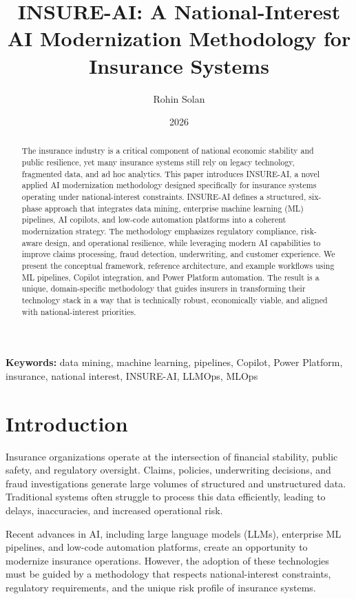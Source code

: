 \documentclass{article}
\title{INSURE-AI: A National-Interest AI Modernization Methodology for Insurance Systems}
\author{Rohin Solan}
\date{2026}
\begin{document}
\maketitle

\begin{abstract}
The insurance industry is a critical component of national economic stability and public resilience, yet many insurance systems still rely on legacy technology, fragmented data, and ad hoc analytics. This paper introduces INSURE-AI, a novel applied AI modernization methodology designed specifically for insurance systems operating under national-interest constraints. INSURE-AI defines a structured, six-phase approach that integrates data mining, enterprise machine learning (ML) pipelines, AI copilots, and low-code automation platforms into a coherent modernization strategy. The methodology emphasizes regulatory compliance, risk-aware design, and operational resilience, while leveraging modern AI capabilities to improve claims processing, fraud detection, underwriting, and customer experience. We present the conceptual framework, reference architecture, and example workflows using ML pipelines, Copilot integration, and Power Platform automation. The result is a unique, domain-specific methodology that guides insurers in transforming their technology stack in a way that is technically robust, economically viable, and aligned with national-interest priorities.
\end{abstract}

\textbf{Keywords:} data mining, machine learning, pipelines, Copilot, Power Platform, insurance, national interest, INSURE-AI, LLMOps, MLOps

\section{Introduction}
Insurance organizations operate at the intersection of financial stability, public safety, and regulatory oversight. Claims, policies, underwriting decisions, and fraud investigations generate large volumes of structured and unstructured data. Traditional systems often struggle to process this data efficiently, leading to delays, inaccuracies, and increased operational risk.

Recent advances in AI, including large language models (LLMs), enterprise ML pipelines, and low-code automation platforms, create an opportunity to modernize insurance operations. However, the adoption of these technologies must be guided by a methodology that respects national-interest constraints, regulatory requirements, and the unique risk profile of insurance systems.
\end{document}

